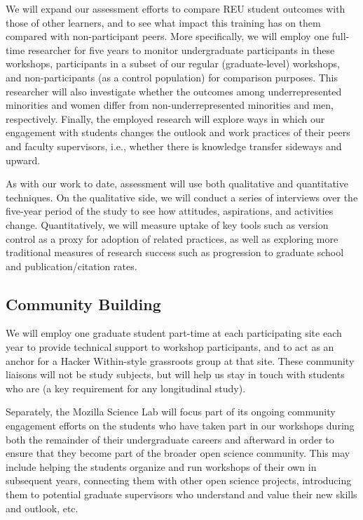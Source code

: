 \documentclass[11pt]{article}
\begin{document}
We will expand our assessment efforts to compare REU student outcomes
with those of other learners, and to see what impact this training has
on them compared with non-participant peers.  More specifically, we
will employ one full-time researcher for five years to monitor
undergraduate participants in these workshops, participants in a
subset of our regular (graduate-level) workshops, and non-participants
(as a control population) for comparison purposes.  This researcher
will also investigate whether the outcomes among
underrepresented minorities and women differ from non-underrepresented minorities and men, respectively. Finally, the employed research will explore ways in which our engagement with students changes
the outlook and work practices of their peers and faculty supervisors,
i.e., whether there is knowledge transfer sideways and upward. 

As with our work to date, assessment will use both qualitative and
quantitative techniques.  On the qualitative side, we will conduct a
series of interviews over the five-year period of the study to see how
attitudes, aspirations, and activities change.  Quantitatively, we
will measure uptake of key tools such as version control as a proxy
for adoption of related practices, as well as exploring more
traditional measures of research success such as progression to
graduate school and publication/citation rates.  

\subsection{Community Building}

We will employ one graduate student part-time at each participating
site each year to provide technical support to workshop participants,
and to act as an anchor for a Hacker Within-style grassroots group at
that site.  These community liaisons will not be study subjects, but
will help us stay in touch with students who are (a key requirement
for any longitudinal study).

Separately, the Mozilla Science Lab will focus part of its ongoing
community engagement efforts on the students who have taken part in
our workshops during both the remainder of their undergraduate careers
and afterward in order to ensure that they become part of the broader
open science community.  This may include helping the students
organize and run workshops of their own in subsequent years,
connecting them with other open science projects, introducing them to
potential graduate supervisors who understand and value their new
skills and outlook, etc.
\end{document}
